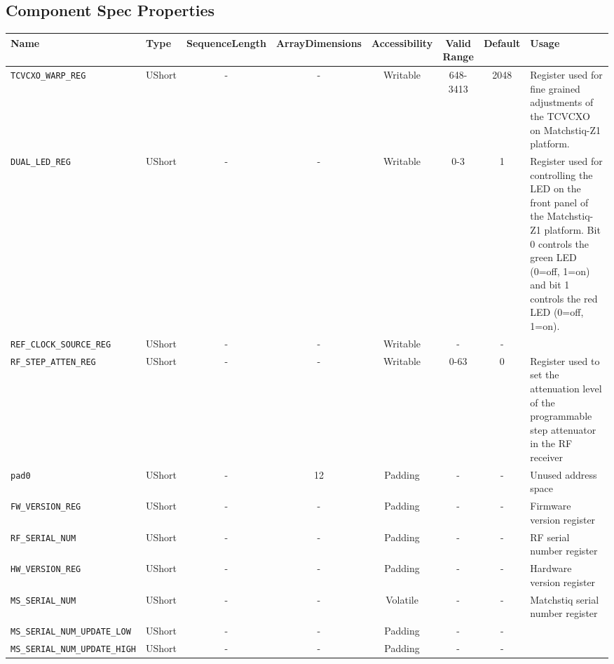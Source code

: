 \begin{landscape}
\section*{Component Spec Properties}
\begin{scriptsize}
		\begin{tabular}{|p{4cm}|p{1cm}|c|c|c|c|c|p{7cm}|}
			\hline
			\rowcolor{blue}
			Name               & Type   & SequenceLength & ArrayDimensions   & Accessibility       & Valid Range                                                                      & Default & Usage                                                                        \\
			\hline
			\verb+TCVCXO_WARP_REG+          & UShort  & - & -  & Writable & 648-3413 & 2048     & Register used for fine grained adjustments of the TCVCXO on Matchstiq-Z1 platform. \\
			\hline
			\verb+DUAL_LED_REG+             & UShort  & - & -  & Writable & 0-3      & 1        & Register used for controlling the LED on the front panel of the Matchstiq-Z1 platform. Bit 0 controls the green LED (0=off, 1=on) and bit 1 controls the red LED (0=off, 1=on). \\
			\hline
			\verb+REF_CLOCK_SOURCE_REG+     & UShort  & - & -  & Writable & -        & -        & \\
			\hline
			\verb+RF_STEP_ATTEN_REG+        & UShort  & - & -  & Writable & 0-63     & 0        & Register used to set the attenuation level of the programmable step attenuator in the RF receiver \\
			\hline
			\verb+pad0+                     & UShort  & - & 12 & Padding  & -        & -        & Unused address space \\
			\hline
			\verb+FW_VERSION_REG+           & UShort  & - & -  & Padding  & -        & -        & Firmware version register \\
			\hline
			\verb+RF_SERIAL_NUM+            & UShort  & - & -  & Padding  & -        & -        & RF serial number register \\
			\hline
			\verb+HW_VERSION_REG+           & UShort  & - & -  & Padding  & -        & -        & Hardware version register \\
			\hline
			\verb+MS_SERIAL_NUM+            & UShort  & - & -  & Volatile & -        & -        & Matchstiq serial number register \\
			\hline
			\verb+MS_SERIAL_NUM_UPDATE_LOW+ & UShort  & - & -  & Padding  & -        & -        & \\
			\hline
			\verb+MS_SERIAL_NUM_UPDATE_HIGH+& UShort  & - & -  & Padding  & -        & -        & \\
			\hline
		\end{tabular}
	\end{scriptsize}

\end{landscape}
